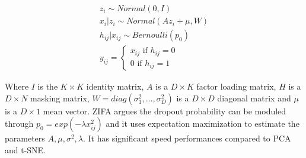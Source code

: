 \documentclass[11pt]{article}
\begin{document}
\begin{equation}
\begin{split}
z_i \sim Normal(0,I) \\
x_i | z_i \sim Normal (Az_i + \mu, W) \\
h_{ij} | x_{ij} \sim Bernoulli ( p_0 ) \\
y_{ij} = 
\left\{
\begin{array}{ll}
x_{ij}\mbox{ if }h_{ij}=0\\
0 \mbox{ if } h_{ij}=1
\end{array}
\right.
\end{split}
\end{equation}

Where $I$ is the $K \times K$ identity matrix, $A$ is a $D \times K$ factor loading matrix, $H$ is a $D \times N$ masking matrix, $W = diag ( \sigma _{1}^{2}, \dots , \sigma _{D}^{2} )$ is a $D \times D$ diagonal matrix and $\mu$ is a $D \times 1$ mean vector. ZIFA argues the dropout probability can be moduled through $p_0 = exp(-\lambda x_{ij}^{2})$ and it uses expectation maximization to estimate the parameters $A,\mu,\sigma^2,\lambda$. It has significant speed performances compared to PCA and t-SNE. 



\end{document}
